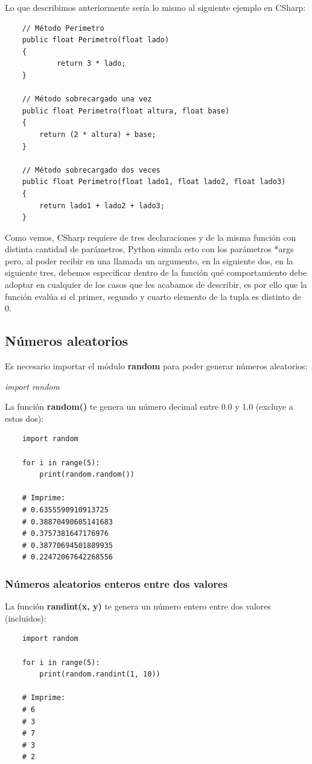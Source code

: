 Lo que describimos anteriormente sería lo mismo al siguiente ejemplo en CSharp:
\begin{lstlisting}
	// Método Perimetro
	public float Perimetro(float lado)
    {
    		return 3 * lado;
    }

    // Método sobrecargado una vez
    public float Perimetro(float altura, float base)
    {
        return (2 * altura) + base;
    }

    // Método sobrecargado dos veces
    public float Perimetro(float lado1, float lado2, float lado3)
    {
        return lado1 + lado2 + lado3;
    }
\end{lstlisting}

Como vemos, CSharp requiere de tres declaraciones y de la misma función con distinta cantidad de parámetros, Python simula esto con los parámetros *args pero, al poder recibir en una llamada un argumento, en la siguiente dos, en la siguiente tres, debemos especificar dentro de la función qué comportamiento debe adoptar en cualquier de los casos que les acabamos de describir, es por ello que la función evalúa si el primer, segundo y cuarto elemento de la tupla es distinto de 0.


\subsection{Números aleatorios}
\hspace{0.55cm}Es necesario importar el módulo \textbf{random} para poder generar números aleatorios:
\begin{center}
	\textit{import random}
\end{center}

La función \textbf{random()} te genera un número decimal entre 0.0 y 1.0 (excluye a estos dos):
\begin{lstlisting}
	import random

	for i in range(5):
		print(random.random())

	# Imprime:
	# 0.6355590910913725
	# 0.38870490605141683
	# 0.3757381647176976
	# 0.38770694501889935
	# 0.22472067642268556
\end{lstlisting}


\subsubsection{Números aleatorios enteros entre dos valores}
\hspace{0.55cm}La función \textbf{randint(x, y)} te genera un número entero entre dos valores (incluidos):
\begin{lstlisting}
	import random

	for i in range(5):
		print(random.randint(1, 10))

	# Imprime:
	# 6
	# 3
	# 7
	# 3
	# 2
\end{lstlisting}



